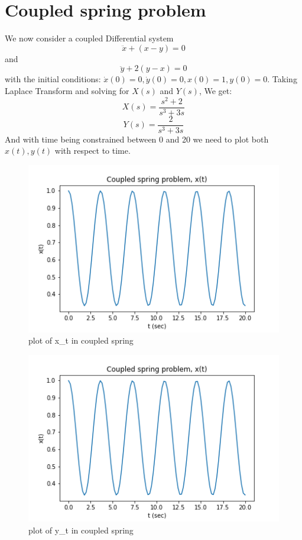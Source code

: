 \documentclass[11pt, a4paper]{article}
\begin{document}
\section{Coupled spring problem}
We now consider a coupled Differential system
\begin{equation}
    \ddot x + (x-y) = 0
\end{equation}
and 
\begin{equation}
    \ddot y + 2(y-x) = 0
\end{equation}
with the initial conditions: $\dot x(0) =0,\dot y(0) =0,x(0) =1,y(0) =0$.
Taking Laplace Transform and solving for $X(s)$ and $Y(s)$, We get:
\begin{equation}
    X(s) = \frac{s^2+2}{s^3 + 3s}
\end{equation}
\begin{equation}
    Y(s) = \frac{2}{s^3 + 3s}
\end{equation}
And with time being constrained between 0 and 20 we need to plot both $x(t),y(t)$ with respect to time.
\begin{figure}[!tbh]
    \centering
    \includegraphics[scale=0.5]{x_t.png}  
    \caption{plot of x_t in coupled spring } 
    \label{fig:fig8}
\end{figure}
\begin{figure}[!tbh]
    \centering
    \includegraphics[scale=0.5]{x_t.png}  
    \caption{plot of y_t in coupled spring } 
    \label{fig:fig9}
\end{figure}
\pagebreak
\newpage
\end{document}
